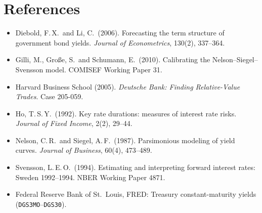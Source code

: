 \documentclass[11pt]{article}
\begin{document}
\section*{References}
\begin{itemize}[leftmargin=1.2em,itemsep=1pt]
\item Diebold, F.\,X.\ and Li, C.\ (2006). Forecasting the term structure of government bond yields.
\emph{Journal of Econometrics}, 130(2), 337--364.
\item Gilli, M., Gro\ss e, S.\ and Schumann, E.\ (2010). Calibrating the Nelson--Siegel--Svensson model.
COMISEF Working Paper 31.
\item Harvard Business School (2005). \emph{Deutsche Bank: Finding Relative-Value Trades}. Case 205-059.
\item Ho, T.\,S.\,Y.\ (1992). Key rate durations: measures of interest rate risks.
\emph{Journal of Fixed Income}, 2(2), 29--44.
\item Nelson, C.\,R.\ and Siegel, A.\,F.\ (1987). Parsimonious modeling of yield curves.
\emph{Journal of Business}, 60(4), 473--489.
\item Svensson, L.\,E.\,O.\ (1994). Estimating and interpreting forward interest rates: Sweden
1992--1994. NBER Working Paper 4871.
\item Federal Reserve Bank of St.\ Louis, FRED: Treasury constant-maturity yields
(\texttt{DGS3MO}--\texttt{DGS30}).
\end{itemize}
\end{document}
